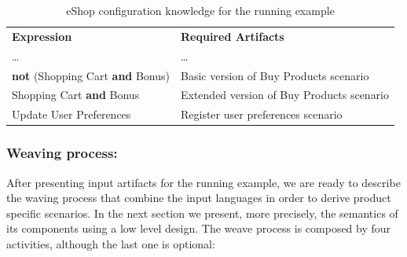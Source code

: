 \documentclass{llncs}
\begin{document}
\begin{table}[h]
\begin{center}
\caption{eShop configuration knowledge for the running example} \label{tab:eshop-running-example}
\begin{tabular}{ll}
   \hline\noalign{\smallskip}
  {\bf Expression} & {\bf Required Artifacts} \\
   \noalign{\smallskip}
   \hline
   \noalign{\smallskip}
    \ldots & \ldots \\
    {\bf not} (Shopping Cart {\bf and} Bonus)\hspace{2pt} & Basic version of Buy Products scenario \\
    Shopping Cart {\bf and} Bonus & Extended version of Buy Products scenario \\
    Update User Preferences & Register user preferences scenario	 \\       
  \hline
\end{tabular}
\end{center}
\end{table}

\subsubsection {Weaving process:} After presenting input artifacts for the running example, we are ready to describe the waving process that combine 
the input languages in order to derive product specific scenarios. In the next section we present, more precisely, the semantics of its components using a low level design. The weave process is composed by four activities, although the last one is optional: 
\end{document}
